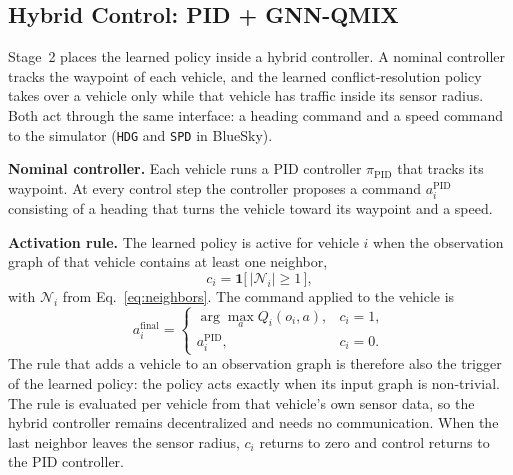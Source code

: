 \subsection{Hybrid Control: PID + GNN-QMIX}
\label{subsec:hybrid}
Stage~2 places the learned policy inside a hybrid controller. A nominal controller tracks
the waypoint of each vehicle, and the learned conflict-resolution policy takes over a
vehicle only while that vehicle has traffic inside its sensor radius. Both act through the
same interface: a heading command and a speed command to the simulator (\texttt{HDG} and
\texttt{SPD} in BlueSky).

\textbf{Nominal controller.} Each vehicle runs a PID controller $\pi_{\text{PID}}$ that
tracks its waypoint. At every control step the controller proposes a command
$a_i^{\text{PID}}$ consisting of a heading that turns the vehicle toward its waypoint and a
speed.

\textbf{Activation rule.} The learned policy is active for vehicle $i$ when the observation
graph of that vehicle contains at least one neighbor,
\begin{equation}
\label{eq:activation}
c_i = \mathbf{1}\big[\,|\mathcal{N}_i| \ge 1\,\big],
\end{equation}
with $\mathcal{N}_i$ from Eq.~\eqref{eq:neighbors}. The command applied to the vehicle is
\begin{equation}
\label{eq:switching}
a^{\text{final}}_i =
\begin{cases}
\arg\max_{a} Q_i(o_i,a), & c_i = 1,\\[2pt]
a^{\text{PID}}_i, & c_i = 0.
\end{cases}
\end{equation}
The rule that adds a vehicle to an observation graph is therefore also the trigger of the
learned policy: the policy acts exactly when its input graph is non-trivial. The rule is
evaluated per vehicle from that vehicle's own sensor data, so the hybrid controller remains
decentralized and needs no communication. When the last neighbor leaves the sensor radius,
$c_i$ returns to zero and control returns to the PID controller.

